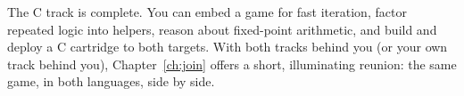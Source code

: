 \begin{prgcheck}
The C track is complete. You can embed a game for fast iteration, factor repeated
logic into helpers, reason about fixed-point arithmetic, and build and deploy a C
cartridge to both targets. With both tracks behind you (or your own track behind
you), Chapter~\ref{ch:join} offers a short, illuminating reunion: the same game,
in both languages, side by side.
\end{prgcheck}
